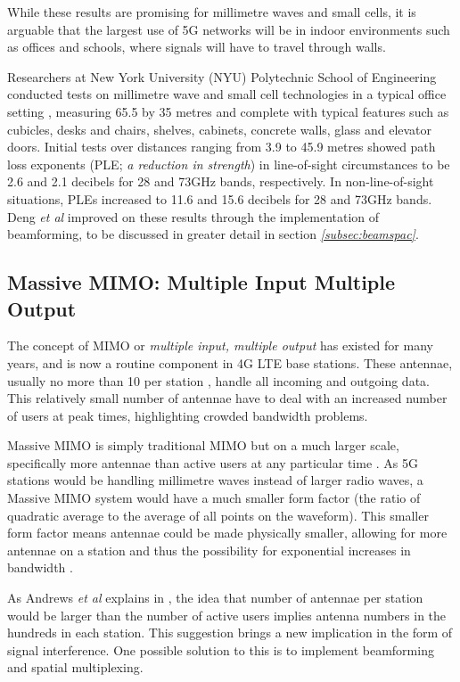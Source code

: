 \documentclass[journal]{IEEEtran}
\begin{document}
While these results are promising for millimetre waves and small cells, it is arguable that the largest use of 5G networks will be in indoor environments such as offices and schools, where signals will have to travel through walls. 

Researchers at New York University (NYU) Polytechnic School of Engineering conducted tests on millimetre wave and small cell technologies in a typical office setting \cite{28_73ghz}, measuring 65.5 by 35 metres and complete with typical features such as cubicles, desks and chairs, shelves, cabinets, concrete walls, glass and elevator doors. Initial tests over distances ranging from 3.9 to 45.9 metres showed path loss exponents (PLE; \textit{a reduction in strength}) in line-of-sight circumstances to be 2.6 and 2.1 decibels for 28 and 73GHz bands, respectively. In non-line-of-sight situations, PLEs increased to 11.6 and 15.6 decibels for 28 and 73GHz bands. Deng \textit{et al} improved on these results through the implementation of beamforming, to be discussed in greater detail in section \textit{\ref{subsec:beamspac}}.

\subsection{Massive MIMO: Multiple Input Multiple Output}
The concept of MIMO or \textit{multiple input, multiple output} has existed for many years, and is now a routine component in 4G LTE base stations. These antennae, usually no more than 10 per station \cite{mimo}, handle all incoming and outgoing data. This relatively small number of antennae have to deal with an increased number of users at peak times, highlighting crowded bandwidth problems.

Massive MIMO is simply traditional MIMO but on a much larger scale, specifically more antennae than active users at any particular time \cite{whatwill5gbe}. As 5G stations would be handling millimetre waves instead of larger radio waves, a Massive MIMO system would have a much smaller form factor (the ratio of quadratic average to the average of all points on the waveform). This smaller form factor means antennae could be made physically smaller, allowing for more antennae on a station and thus the possibility for exponential increases in bandwidth \cite{mimo}.

As Andrews \textit{et al} explains in \cite{whatwill5gbe}, the idea that number of antennae per station would be larger than the number of active users implies antenna numbers in the hundreds in each station. This suggestion brings a new implication in the form of signal interference. One possible solution to this is to implement beamforming and spatial multiplexing.
\end{document}
